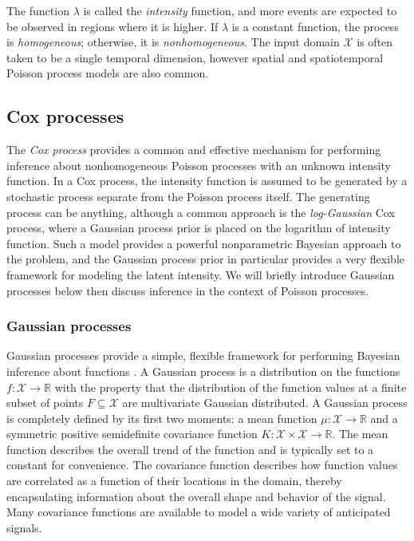 \documentclass{article}
\newcommand{\cm}[1]{\mathcal{#1}}
\newcommand{\R}{\mathbb{R}}
\begin{document}
The function $\lambda$ is called the \emph{intensity} function, and
more events are expected to be observed in regions where it is higher.
If $\lambda$ is a constant function, the process is
\emph{homogeneous}; otherwise, it is \emph{nonhomogeneous}.  The input
domain $\cm{X}$ is often taken to be a single temporal dimension,
however spatial and spatiotemporal Poisson process models are also
common.

\subsection{Cox processes}

The \emph{Cox process} provides a common and effective mechanism for
performing inference about nonhomogeneous Poisson processes with an
unknown intensity function.  In a Cox process, the intensity function
is assumed to be generated by a stochastic process separate from the
Poisson process itself.  The generating process can be anything,
although a common approach is the \emph{log-Gaussian} Cox process,
where a Gaussian process prior is placed on the logarithm of intensity
function.  Such a model provides a powerful nonparametric Bayesian
approach to the problem, and the Gaussian process prior in particular
provides a very flexible framework for modeling the latent intensity.
We will briefly introduce Gaussian processes below then discuss
inference in the context of Poisson processes.

\subsubsection{Gaussian processes}

Gaussian processes provide a simple, flexible framework for performing
Bayesian inference about functions \citep{gpml}.  A Gaussian process
is a distribution on the functions $f\colon \cm{X} \to \R$ with the
property that the distribution of the function values at a finite
subset of points $F \subseteq \cm{X}$ are multivariate Gaussian
distributed. A Gaussian process is completely defined by its first two
moments: a mean function $\mu\colon \cm{X} \to \R$ and a symmetric
positive semidefinite covariance function $K\colon \cm{X} \times
\cm{X} \to \R$.  The mean function describes the overall trend of the
function and is typically set to a constant for convenience.  The
covariance function describes how function values are correlated as a
function of their locations in the domain, thereby encapsulating
information about the overall shape and behavior of the signal.  Many
covariance functions are available to model a wide variety of
anticipated signals.
\end{document}
